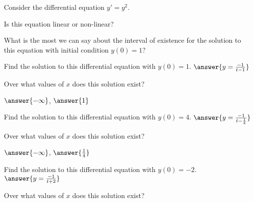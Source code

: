 \documentclass{ximera}
\begin{document}
\begin{exercise}
    Consider the differential equation $y' = y^2$. 
    
    Is this equation linear or non-linear?
    \begin{multipleChoice}
    \end{multipleChoice}
    \begin{problem}
        What is the most we can say about the interval of existence for the solution to this equation with initial condition $y(0) = 1$?
        
        \begin{multipleChoice}
        \end{multipleChoice}
        \begin{problem}
            Find the solution to this differential equation with $y(0) = 1$. $\answer{y = \frac{-1}{t-1}}$
            \begin{problem}
                Over what values of $x$ does this solution exist?
                
                \wordChoice{\choice[correct]{(},\choice{[}}$\answer{-\infty}$, $\answer{1}$\wordChoice{\choice[correct]{)},\choice{]}}
            \end{problem}
        \end{problem}
        \begin{problem}
            Find the solution to this differential equation with $y(0) = 4$. $\answer{y = \frac{-1}{t - \frac{1}{4}}}$
            \begin{problem}
                Over what values of $x$ does this solution exist?
                
                \wordChoice{\choice[correct]{(},\choice{[}}$\answer{-\infty}$, $\answer{\frac{1}{4}}$\wordChoice{\choice[correct]{)},\choice{]}}
            \end{problem}
        \end{problem}
        \begin{problem}
            Find the solution to this differential equation with $y(0) = -2$. $\answer{y = \frac{-1}{t+2}}$
            \begin{problem}
                Over what values of $x$ does this solution exist?
                

\end{problem}
\end{problem}
\end{problem}
\end{exercise}
\end{document}
